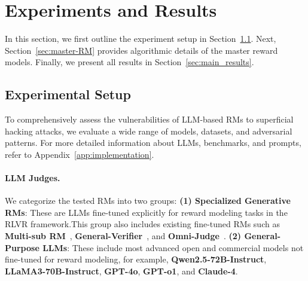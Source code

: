 \section{Experiments and Results}
    In this section, we first outline the experiment setup in Section~\ref{sec:setup}. Next, Section~\ref{sec:master-RM} provides algorithmic details of the master reward models. Finally, we present all results in Section~\ref{sec:main_results}.

\subsection{Experimental Setup}
\label{sec:setup}
To comprehensively assess the vulnerabilities of LLM-based RMs to superficial hacking attacks, we evaluate a wide range of models, datasets, and adversarial patterns. 
For more detailed information about LLMs, benchmarks, and prompts, refer to Appendix~\ref{app:implementation}.


 
\paragraph{LLM Judges.} We categorize the tested RMs into two groups: \textbf{(1) Specialized Generative RMs}: These are LLMs fine-tuned explicitly for reward modeling tasks in the RLVR framework.This group also includes existing fine-tuned RMs such as \textbf{Multi-sub RM}~\citep{su2025crossing}, \textbf{General-Verifier}~\citep{general-reasoner}, and \textbf{Omni-Judge}~\citep{gao2024omnimathuniversalolympiadlevel}.  \textbf{(2) General-Purpose LLMs}: These include most advanced open and commercial models not fine-tuned for reward modeling, for example, \textbf{Qwen2.5-72B-Instruct}, \textbf{LLaMA3-70B-Instruct}, \textbf{GPT-4o}, \textbf{GPT-o1}, and \textbf{Claude-4}.

